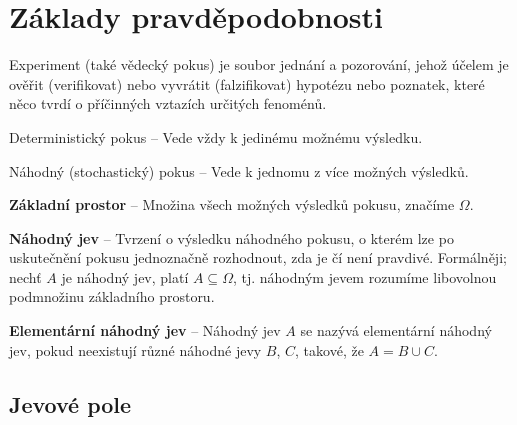
\section{Základy pravděpodobnosti}

\begin{compactitem}
    \item Experiment (také vědecký pokus) je soubor jednání a pozorování, jehož účelem je ověřit (verifikovat) nebo vyvrátit (falzifikovat) hypotézu nebo poznatek, které něco tvrdí o příčinných vztazích určitých fenoménů. \begin{compactitem}

        \item Deterministický pokus -- Vede vždy k jedinému možnému výsledku.

        \item Náhodný (stochastický) pokus -- Vede k jednomu z více možných výsledků.
    \end{compactitem}

    \item \textbf{Základní prostor} -- Množina všech možných výsledků pokusu, značíme $\Omega$.

    \item \textbf{Náhodný jev} -- Tvrzení o výsledku náhodného pokusu, o kterém lze po uskutečnění pokusu jednoznačně rozhodnout, zda je čí není pravdivé. Formálněji; nechť $A$ je náhodný jev, platí $A \subseteq \Omega$, tj. náhodným jevem rozumíme libovolnou podmnožinu základního prostoru.

    \item \textbf{Elementární náhodný jev} -- Náhodný jev $A$ se nazývá elementární náhodný jev, pokud neexistují různé náhodné jevy $B$, $C$, takové, že $A = B \cup C$.
\end{compactitem}

\subsection{Jevové pole}

